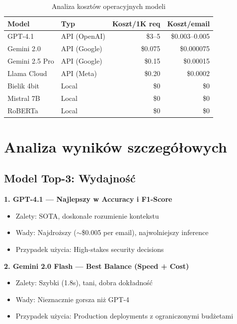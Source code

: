 \documentclass[11pt]{extreport}
\begin{document}
\begin{table}[H]
\centering
\caption{Analiza kosztów operacyjnych modeli}
\label{tab:koszty}
\begin{tabular}{@{}llrr@{}}
\toprule
\textbf{Model} & \textbf{Typ} & \textbf{Koszt/1K req} & \textbf{Koszt/email} \\ 
\midrule
GPT-4.1        & API (OpenAI) & \$3--5    & \$0.003--0.005 \\
Gemini 2.0     & API (Google) & \$0.075   & \$0.000075 \\
Gemini 2.5 Pro & API (Google) & \$0.15    & \$0.00015 \\
Llama Cloud    & API (Meta)   & \$0.20    & \$0.0002 \\
Bielik 4bit    & Local        & \$0       & \$0 \\
Mistral 7B     & Local        & \$0       & \$0 \\
RoBERTa        & Local        & \$0       & \$0 \\
\bottomrule
\end{tabular}
\end{table}

\section{Analiza wyników szczegółowych}
\label{sec:analiza-wynikow}

\subsection{Model Top-3: Wydajność}

\textbf{1. GPT-4.1 --- Najlepszy w Accuracy i F1-Score}
\begin{itemize}
    \item Zalety: SOTA, doskonałe rozumienie kontekstu
    \item Wady: Najdroższy ($\sim$\$0.005 per email), najwolniejszy inference
    \item Przypadek użycia: High-stakes security decisions
\end{itemize}

\textbf{2. Gemini 2.0 Flash --- Best Balance (Speed + Cost)}
\begin{itemize}
    \item Zalety: Szybki (1.8s), tani, dobra dokładność
    \item Wady: Nieznacznie gorsza niż GPT-4
    \item Przypadek użycia: Production deployments z ograniczonymi budżetami
\end{itemize}
\end{document}
